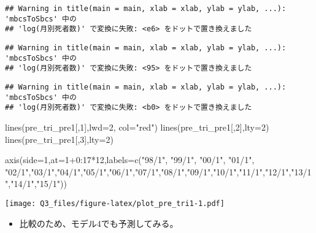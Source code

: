 \documentclass[]{article}
\newenvironment{Shaded}{\begin{snugshade}}{\end{snugshade}}
\newcommand{\AttributeTok}[1]{\textcolor[rgb]{0.77,0.63,0.00}{#1}}
\newcommand{\DecValTok}[1]{\textcolor[rgb]{0.00,0.00,0.81}{#1}}
\newcommand{\FunctionTok}[1]{\textcolor[rgb]{0.00,0.00,0.00}{#1}}
\newcommand{\NormalTok}[1]{#1}
\newcommand{\SpecialCharTok}[1]{\textcolor[rgb]{0.00,0.00,0.00}{#1}}
\newcommand{\StringTok}[1]{\textcolor[rgb]{0.31,0.60,0.02}{#1}}
\providecommand{\tightlist}{%
  \setlength{\itemsep}{0pt}\setlength{\parskip}{0pt}}
\begin{document}
\begin{verbatim}
## Warning in title(main = main, xlab = xlab, ylab = ylab, ...): 'mbcsToSbcs' 中の
## 'log(月別死者数)' で変換に失敗: <e6> をドットで置き換えました
\end{verbatim}

\begin{verbatim}
## Warning in title(main = main, xlab = xlab, ylab = ylab, ...): 'mbcsToSbcs' 中の
## 'log(月別死者数)' で変換に失敗: <95> をドットで置き換えました
\end{verbatim}

\begin{verbatim}
## Warning in title(main = main, xlab = xlab, ylab = ylab, ...): 'mbcsToSbcs' 中の
## 'log(月別死者数)' で変換に失敗: <b0> をドットで置き換えました
\end{verbatim}

\begin{Shaded}
\begin{Highlighting}[]
\FunctionTok{lines}\NormalTok{(pre\_tri\_pre1[,}\DecValTok{1}\NormalTok{],}\AttributeTok{lwd=}\DecValTok{2}\NormalTok{, }\AttributeTok{col=}\StringTok{"red"}\NormalTok{)}
\FunctionTok{lines}\NormalTok{(pre\_tri\_pre1[,}\DecValTok{2}\NormalTok{],}\AttributeTok{lty=}\DecValTok{2}\NormalTok{)}
\FunctionTok{lines}\NormalTok{(pre\_tri\_pre1[,}\DecValTok{3}\NormalTok{],}\AttributeTok{lty=}\DecValTok{2}\NormalTok{)}

\FunctionTok{axis}\NormalTok{(}\AttributeTok{side=}\DecValTok{1}\NormalTok{,}\AttributeTok{at=}\DecValTok{1}\SpecialCharTok{+}\DecValTok{0}\SpecialCharTok{:}\DecValTok{17}\SpecialCharTok{*}\DecValTok{12}\NormalTok{,}\AttributeTok{labels=}\FunctionTok{c}\NormalTok{(}\StringTok{"98/1"}\NormalTok{, }\StringTok{"99/1"}\NormalTok{, }\StringTok{"00/1"}\NormalTok{, }\StringTok{"01/1"}\NormalTok{, }\StringTok{"02/1"}\NormalTok{,}\StringTok{"03/1"}\NormalTok{,}\StringTok{"04/1"}\NormalTok{,}\StringTok{"05/1"}\NormalTok{,}\StringTok{"06/1"}\NormalTok{,}\StringTok{"07/1"}\NormalTok{,}\StringTok{"08/1"}\NormalTok{,}\StringTok{"09/1"}\NormalTok{,}\StringTok{"10/1"}\NormalTok{,}\StringTok{"11/1"}\NormalTok{,}\StringTok{"12/1"}\NormalTok{,}\StringTok{"13/1"}\NormalTok{,}\StringTok{"14/1"}\NormalTok{,}\StringTok{"15/1"}\NormalTok{))}
\end{Highlighting}
\end{Shaded}

\texttt{[image: Q3\_files/figure-latex/plot\_pre\_tri1-1.pdf]}

\begin{itemize}
\tightlist
\item
  比較のため、モデル4でも予測してみる。
\end{itemize}
\end{document}
